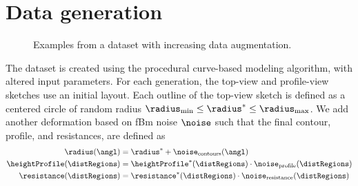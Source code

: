 \section{Data generation}
\label{sec:coral-island_dataset-generation}



\begin{figure}[b]
	\centering
    \caption{Examples from a dataset with increasing data augmentation.}
    \label{fig:coral-island_cGAN-examples}
\end{figure}


The dataset is created using the procedural curve-based modeling algorithm, with altered input parameters. For each generation, the top-view and profile-view sketches use an initial layout. Each outline of the top-view sketch is defined as a centered circle of random radius $\radius_\text{min} \leq \radius^* \leq \radius_\text{max}$. We add another deformation based on fBm noise $\noise$ such that the final contour, profile, and resistances, are defined as 
\begin{align}
    \radius(\angl) &= \radius^* + \noise_{\text{contours}}(\angl) \nonumber \\
    \heightProfile(\distRegions) &= \heightProfile^*(\distRegions) \cdot \noise_{\text{profile}}(\distRegions) \nonumber \\
    \resistance(\distRegions) &= \resistance^*(\distRegions) \cdot \noise_{\text{resistance}}(\distRegions) \nonumber
\end{align}


